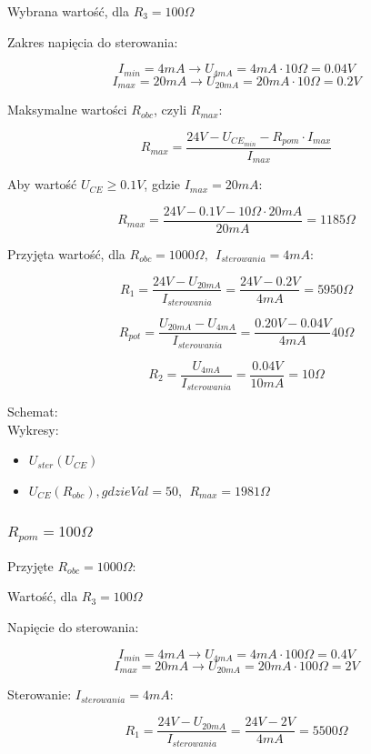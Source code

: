 \documentclass{article}
\begin{document}
Wybrana wartość, dla $R_{3} = 100 \Omega$

Zakres napięcia do sterowania:

$$
    I_{min} = 4mA \rightarrow U_{4mA} = 4mA \cdot 10 \Omega = 0.04V
$$
$$
    I_{max} = 20mA \rightarrow U_{20mA} = 20mA \cdot 10 \Omega = 0.2V
$$

Maksymalne wartości $R_{obc}$, czyli $R_{max}$:

$$
    R_{max} = \frac{24V-U_{CE_{min}}-R_{pom}\cdot I_{max}}{I_{max}}
$$

Aby wartość $U_{CE} \geq 0.1V$, gdzie $I_{max}=20mA$:

$$
    R_{max}=\frac{24V-0.1V-10\Omega \cdot 20mA}{20mA}=1185\Omega
$$

Przyjęta wartość, dla $R_{obc} = 1000 \Omega, \ \ I_{sterowania} = 4mA$:

$$
    R_{1} = \frac{24V - U_{20mA}}{I_{sterowania}}=\frac{24V - 0.2V}{4mA} = 5950 \Omega
$$

$$
    R_{pot} = \frac{U_{20mA} - U_{4mA}}{I_{sterowania}} = 
    \frac{0.20V-0.04V}{4mA} 40\Omega
$$


$$
    R_{2} = \frac{U_{4mA}}{I_{sterowania}} = \frac{0.04V}{10mA} = 10 \Omega
$$

Schemat:\\
Wykresy:

\begin{itemize}
    \item $U_{ster}(U_{CE})$
    \item $U_{CE}(R_{obc}), gdzie Val = 50, \ \ R_{max} = 1981 \Omega$
\end{itemize}






\newpage
\subsubsection{$R_{pom} = 100 \Omega$}


Przyjęte $R_{obc} = 1000 \Omega$:


Wartość, dla $R_{3} = 100 \Omega$

Napięcie do sterowania:

$$
I_{min} = 4mA \rightarrow U_{4mA} = 4mA \cdot 100 \Omega = 0.4V
$$
$$
I_{max} = 20mA \rightarrow U_{20mA} = 20mA \cdot 100 \Omega = 2V
$$

Sterowanie: $I_{sterowania} = 4mA$:

$$
    R_{1} = \frac{24V - U_{20mA}}{I_{sterowania}}=\frac{24V - 2V}{4mA} = 5500 \Omega
$$
\end{document}

